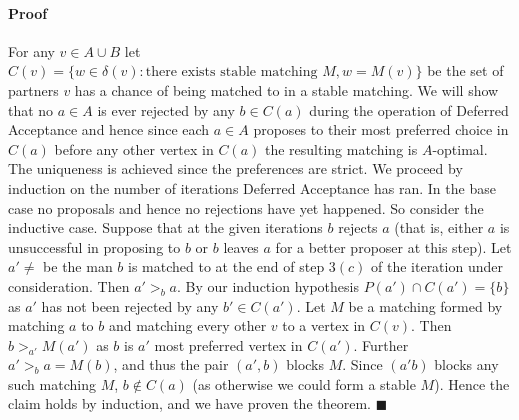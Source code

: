 \paragraph{Proof} 
For any $v \in A\cup B$ let $C(v) = \{w \in \delta(v) : \text{there exists stable matching } M, w = M(v) \}$ be the set of partners $v$ has a chance of being matched to in a stable matching. We will show that no $a \in A$ is ever rejected by any $b \in C(a)$ during the operation of Deferred Acceptance and hence since each $a \in A$ proposes to their most preferred choice in $C(a)$ before any other vertex in $C(a)$ the resulting matching is $A$-optimal. The uniqueness is achieved since the preferences are strict. We proceed by induction on the number of iterations Deferred Acceptance has ran. In the base case no proposals and hence no rejections have yet happened. So consider the inductive case. Suppose that at the given iterations $b$ rejects $a$ (that is, either $a$ is unsuccessful in proposing to $b$ or $b$ leaves $a$ for a better proposer at this step). Let $a' \neq$ be the man $b$ is matched to at the end of step $3(c)$ of the iteration under consideration. Then $a' >_b a$. By our induction hypothesis $P(a') \cap C(a') = \{b\}$ as $a'$ has not been rejected by any $b' \in C(a')$. Let $M$ be a matching formed by matching $a$ to $b$ and matching every other $v$ to a vertex in $C(v)$. Then $b >_{a'} M(a')$ as $b$ is $a'$ most preferred vertex in $C(a')$. Further $a' >_b a=M(b)$, and thus the pair $(a',b)$ blocks $M$. Since $(a'b)$ blocks any such matching $M$, $b \not\in C(a)$ (as otherwise we could form a stable $M$). Hence the claim holds by induction, and we have proven the theorem. $\blacksquare$
